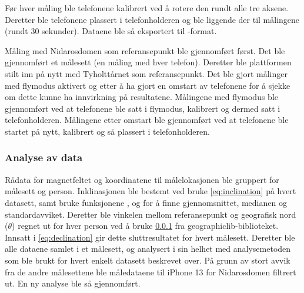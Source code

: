 Før hver måling ble telefonene kalibrert ved å rotere den rundt alle tre aksene. Deretter ble telefonene plassert i telefonholderen og ble liggende der til målingene (rundt $30$ sekunder). Dataene ble så eksportert til -format. 

Måling med Nidarosdomen som referansepunkt ble gjennomført først. Det ble gjennomført et målesett (en måling med hver telefon). Deretter ble plattformen stilt inn på nytt med Tyholttårnet som referansepunkt. Det ble gjort målinger med flymodus aktivert og etter å ha gjort en omstart av telefonene for å sjekke om dette kunne ha innvirkning på resultatene. Målingene med flymodus ble gjennomført ved at telefonene ble satt i flymodus, kalibrert og dermed satt i telefonholderen. Målingene etter omstart ble gjennomført ved at telefonene ble startet på nytt, kalibrert og så plassert i telefonholderen.

\subsubsection{Analyse av data}
Rådata for magnetfeltet og koordinatene til målelokasjonen ble gruppert for målesett og person.
Inklinasjonen ble bestemt ved bruke \eqref{eq:inclination} på hvert datasett, samt bruke funksjonene 
\href{https://numpy.org/doc/stable/reference/generated/numpy.mean.html#numpy.mean}{}, 
\href{https://numpy.org/doc/stable/reference/generated/numpy.median.html#numpy-median}{} og 
\href{https://docs.scipy.org/doc/scipy/reference/generated/scipy.stats.tstd.html#scipy.stats.tstd}
{} for å finne gjennomsnittet, medianen og 
standardavviket.
Deretter ble vinkelen mellom referansepunkt og geografisk nord ($\theta$) regnet ut for hver person ved å 
bruke \ref{} fra geographiclib-biblioteket.
Innsatt i \eqref{eq:declination} gir dette sluttresultatet for hvert målesett.
Deretter ble alle dataene samlet i et målesett, og analysert i sin helhet med analysemetoden som ble brukt 
for hvert enkelt datasett beskrevet over.
På grunn av stort avvik fra de andre målesettene ble måledataene til iPhone 13 for Nidarosdomen filtrert ut. En ny analyse ble så gjennomført. 
 
